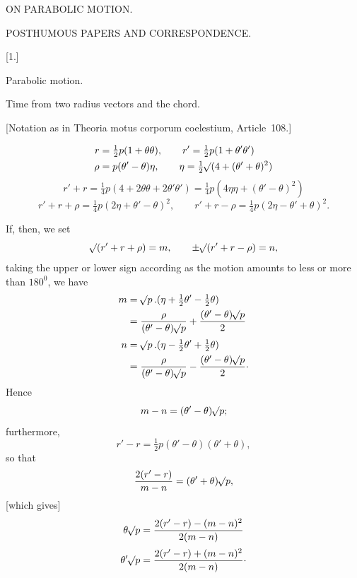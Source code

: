 \clearpage
\thispagestyle{empty}
\vspace*{1.6in}
\begin{center}
{\Large ON PARABOLIC MOTION.\par}
\end{center}
\clearpage
{}
\begin{center}
{\large POSTHUMOUS PAPERS AND CORRESPONDENCE.\par}
\par
\medskip
{}[1.]\par
\medskip
Parabolic motion.\par
\medskip

Time from two radius vectors and the chord.
\medskip

[Notation as in Theoria motus corporum coelestium, Article~108.]
\end{center}
\[
\begin{aligned}
r&=\tfrac{1}{2}p(1+\theta\theta),\qquad r'=\tfrac{1}{2}p(1+\theta'\theta')\\
\rho&=p(\theta'-\theta)\eta,\qquad \eta=\tfrac{1}{2}\mathord{{}^{}\!\surd}(4+(\theta'+\theta)^2)
\end{aligned}
\]
\[
r'+r=\tfrac{1}{4}p(4+2\theta\theta+2\theta'\theta')=\tfrac{1}{4}p(4\eta\eta+(\theta'-\theta)^2)
\]
\[
r'+r+\rho=\tfrac{1}{4}p(2\eta+\theta'-\theta)^2,\qquad
r'+r-\rho=\tfrac{1}{4}p(2\eta-\theta'+\theta)^2.
\]

If, then, we set
\[
\mathord{{}^{}\!\surd}(r'+r+\rho)=m,\qquad \pm\mathord{{}^{}\!\surd}(r'+r-\rho)=n,
\]
taking the upper or lower sign according as the motion amounts to less or more than \(180^0\), we have
\[
\begin{aligned}
m&=\mathord{{}^{}\!\surd}p\,.(\eta+\tfrac{1}{2}\theta'-\tfrac{1}{2}\theta)\\
&=\frac{\rho}{(\theta'-\theta)\mathord{{}^{}\!\surd}p}+\frac{(\theta'-\theta)\mathord{{}^{}\!\surd}p}{2}\\[.5ex]
n&=\mathord{{}^{}\!\surd}p\,.(\eta-\tfrac{1}{2}\theta'+\tfrac{1}{2}\theta)\\
&=\frac{\rho}{(\theta'-\theta)\mathord{{}^{}\!\surd}p}-\frac{(\theta'-\theta)\mathord{{}^{}\!\surd}p}{2}\mathpunct{\cdot}
\end{aligned}
\]
Hence
\[
m-n=(\theta'-\theta)\mathord{{}^{}\!\surd}p;
\]
furthermore,
\[
r'-r=\tfrac{1}{2}p(\theta'-\theta)(\theta'+\theta),
\]
so that
\[
\frac{2(r'-r)}{m-n}=(\theta'+\theta)\mathord{{}^{}\!\surd}p,
\]
[which gives]
\[
\begin{aligned}
\theta\mathord{{}^{}\!\surd}p&=\frac{2(r'-r)-(m-n)^2}{2(m-n)}\\[.5ex]
\theta'\mathord{{}^{}\!\surd}p&=\frac{2(r'-r)+(m-n)^2}{2(m-n)}\mathpunct{\cdot}
\end{aligned}
\]

